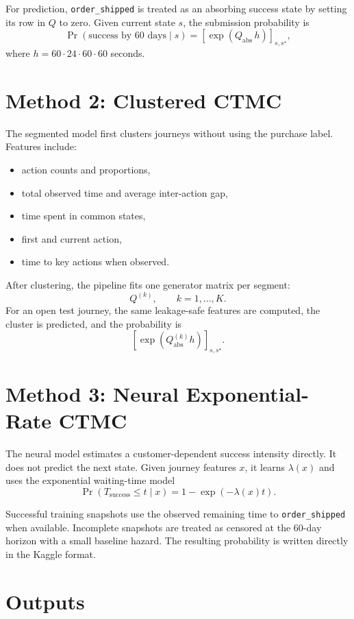 \documentclass[11pt]{article}
\begin{document}
For prediction, \texttt{order\_shipped} is treated as an absorbing success
state by setting its row in \(Q\) to zero.  Given current state \(s\), the
submission probability is
\[
\Pr(\text{success by }60\text{ days}\mid s)
= \left[\exp(Q_{\mathrm{abs}}\,h)\right]_{s,s^\star},
\]
where \(h=60\cdot24\cdot60\cdot60\) seconds.

\section{Method 2: Clustered CTMC}

The segmented model first clusters journeys without using the purchase label.
Features include:

\begin{itemize}[leftmargin=*]
\item action counts and proportions,
\item total observed time and average inter-action gap,
\item time spent in common states,
\item first and current action,
\item time to key actions when observed.
\end{itemize}

After clustering, the pipeline fits one generator matrix per segment:
\[
Q^{(k)}, \qquad k=1,\ldots,K.
\]
For an open test journey, the same leakage-safe features are computed, the
cluster is predicted, and the probability is
\[
\left[\exp(Q^{(k)}_{\mathrm{abs}}h)\right]_{s,s^\star}.
\]

\section{Method 3: Neural Exponential-Rate CTMC}

The neural model estimates a customer-dependent success intensity directly.  It
does not predict the next state.  Given journey features \(x\), it learns
\(\lambda(x)\) and uses the exponential waiting-time model
\[
\Pr(T_{\mathrm{success}}\le t\mid x)=1-\exp(-\lambda(x)t).
\]

Successful training snapshots use the observed remaining time to
\texttt{order\_shipped} when available.  Incomplete snapshots are treated as
censored at the 60-day horizon with a small baseline hazard.  The resulting
probability is written directly in the Kaggle format.

\section{Outputs}
\end{document}

